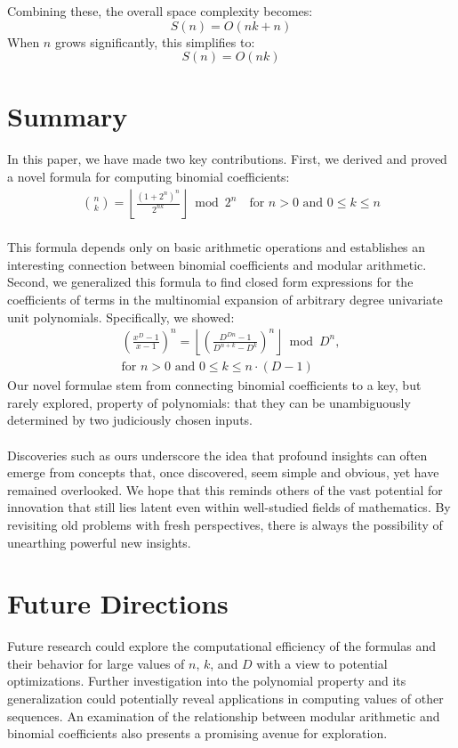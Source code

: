 \documentclass{article}
\theoremstyle{plain}
\theoremstyle{definition}
\begin{document}
Combining these, the overall space complexity becomes:
\[
S(n) = O(nk + n)
\]
When \(n\) grows significantly, this simplifies to:
\[
S(n) = O(nk)
\]

\section{Summary}
In this paper, we have made two key contributions. First, we derived and proved a novel formula for computing binomial coefficients:
\begin{align*}
\binom{n}{k} = \left\lfloor\frac{(1 + 2^{n})^{n}}{2^{n k}}\right\rfloor \bmod{2^{n}} \quad \text{for } n > 0 \text{ and } 0 \leq k \leq n
\end{align*}
\\
This formula depends only on basic arithmetic operations and establishes an interesting connection between binomial coefficients and modular arithmetic. 
\\
Second, we generalized this formula to find closed form expressions for the coefficients of terms in the multinomial expansion of arbitrary degree univariate unit polynomials. Specifically, we showed:
\begin{align*}
[x^k] \left(\frac{x^{D}-1}{x-1}\right)^n = \left\lfloor \left(\frac{D^{Dn} - 1}{D^{n+k} - D^k}\right)^n\right\rfloor \bmod D^n, \\ \text{for } n > 0 \text{ and } 0 \leq k \leq n \cdot (D-1)
\end{align*}
Our novel formulae stem from connecting binomial coefficients to a key, but rarely explored, property of polynomials: that they can be unambiguously determined by two judiciously chosen inputs.
\\
\\
Discoveries such as ours underscore the idea that profound insights can often emerge from concepts that, once discovered, seem simple and obvious, yet have remained overlooked. We hope that this reminds others of the vast potential for innovation that still lies latent even within well-studied fields of mathematics. By revisiting old problems with fresh perspectives, there is always the possibility of unearthing powerful new insights.

\section{Future Directions}
Future research could explore the computational efficiency of the formulas and their behavior for large values of \(n\), \(k\), and \(D\) with a view to potential optimizations. Further investigation into the polynomial property and its generalization could potentially reveal applications in computing values of other sequences. An examination of the relationship between modular arithmetic and binomial coefficients also presents a promising avenue for exploration.



\end{document}
